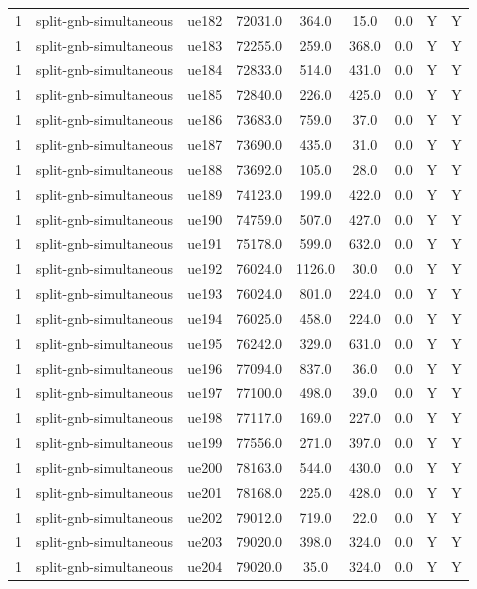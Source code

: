 \begin{table}[ht]
\begin{tabular}{|c|c|c|c|c|c|c|c|c|}
1 & split-gnb-simultaneous & ue182 & 72031.0 & 364.0 & 15.0 & 0.0 & Y & Y \\
1 & split-gnb-simultaneous & ue183 & 72255.0 & 259.0 & 368.0 & 0.0 & Y & Y \\
1 & split-gnb-simultaneous & ue184 & 72833.0 & 514.0 & 431.0 & 0.0 & Y & Y \\
1 & split-gnb-simultaneous & ue185 & 72840.0 & 226.0 & 425.0 & 0.0 & Y & Y \\
1 & split-gnb-simultaneous & ue186 & 73683.0 & 759.0 & 37.0 & 0.0 & Y & Y \\
1 & split-gnb-simultaneous & ue187 & 73690.0 & 435.0 & 31.0 & 0.0 & Y & Y \\
1 & split-gnb-simultaneous & ue188 & 73692.0 & 105.0 & 28.0 & 0.0 & Y & Y \\
1 & split-gnb-simultaneous & ue189 & 74123.0 & 199.0 & 422.0 & 0.0 & Y & Y \\
1 & split-gnb-simultaneous & ue190 & 74759.0 & 507.0 & 427.0 & 0.0 & Y & Y \\
1 & split-gnb-simultaneous & ue191 & 75178.0 & 599.0 & 632.0 & 0.0 & Y & Y \\
1 & split-gnb-simultaneous & ue192 & 76024.0 & 1126.0 & 30.0 & 0.0 & Y & Y \\
1 & split-gnb-simultaneous & ue193 & 76024.0 & 801.0 & 224.0 & 0.0 & Y & Y \\
1 & split-gnb-simultaneous & ue194 & 76025.0 & 458.0 & 224.0 & 0.0 & Y & Y \\
1 & split-gnb-simultaneous & ue195 & 76242.0 & 329.0 & 631.0 & 0.0 & Y & Y \\
1 & split-gnb-simultaneous & ue196 & 77094.0 & 837.0 & 36.0 & 0.0 & Y & Y \\
1 & split-gnb-simultaneous & ue197 & 77100.0 & 498.0 & 39.0 & 0.0 & Y & Y \\
1 & split-gnb-simultaneous & ue198 & 77117.0 & 169.0 & 227.0 & 0.0 & Y & Y \\
1 & split-gnb-simultaneous & ue199 & 77556.0 & 271.0 & 397.0 & 0.0 & Y & Y \\
1 & split-gnb-simultaneous & ue200 & 78163.0 & 544.0 & 430.0 & 0.0 & Y & Y \\
1 & split-gnb-simultaneous & ue201 & 78168.0 & 225.0 & 428.0 & 0.0 & Y & Y \\
1 & split-gnb-simultaneous & ue202 & 79012.0 & 719.0 & 22.0 & 0.0 & Y & Y \\
1 & split-gnb-simultaneous & ue203 & 79020.0 & 398.0 & 324.0 & 0.0 & Y & Y \\
1 & split-gnb-simultaneous & ue204 & 79020.0 & 35.0 & 324.0 & 0.0 & Y & Y \\

\end{tabular}
\end{table}
